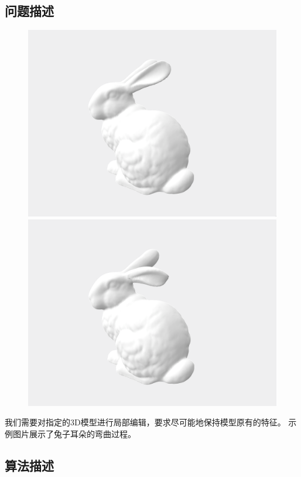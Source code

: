 \documentclass[lang=cn,11pt,a4paper]{elegantpaper}
\begin{document}
\subsection{问题描述}

\begin{figure}[ht]
	\begin{minipage}{0.5\linewidth}
		\centering
		\includegraphics[width=0.85\linewidth]{image/bun_zipper.png}
	\end{minipage}%
	\begin{minipage}{0.5\linewidth}
		\centering
		\includegraphics[width=0.85 \linewidth]{image/result_alpha_1.0.png}
	\end{minipage}
\end{figure}

我们需要对指定的3D模型进行局部编辑，要求尽可能地保持模型原有的特征。
示例图片展示了兔子耳朵的弯曲过程。

\subsection{算法描述}
\end{document}
